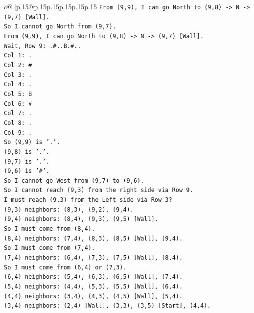 \documentclass{article}
\begin{document}
{\begin{supertabular}{c@{$\;$}|p{.15\linewidth}@{}p{.15\linewidth}p{.15\linewidth}p{.15\linewidth}p{.15\linewidth}p{.15\linewidth}}
{{{\texttt{From (9,9), I can go North to (9,8) {-}> N {-}> (9,7) {[}Wall{]}.} \\
\texttt{So I cannot go North from (9,7).} \\
\texttt{From (9,9), I can go North to (9,8) {-}> N {-}> (9,7) {[}Wall{]}.} \\
\texttt{Wait, Row 9: .\#..B.\#..} \\
\texttt{Col 1: .} \\
\texttt{Col 2: \#} \\
\texttt{Col 3: .} \\
\texttt{Col 4: .} \\
\texttt{Col 5: B} \\
\texttt{Col 6: \#} \\
\texttt{Col 7: .} \\
\texttt{Col 8: .} \\
\texttt{Col 9: .} \\
\texttt{So (9,9) is '.'.} \\
\texttt{(9,8) is '.'.} \\
\texttt{(9,7) is '.'.} \\
\texttt{(9,6) is '\#'.} \\
\texttt{So I cannot go West from (9,7) to (9,6).} \\
\texttt{So I cannot reach (9,3) from the right side via Row 9.} \\
\texttt{I must reach (9,3) from the Left side via Row 3?} \\
\texttt{(9,3) neighbors: (8,3), (9,2), (9,4).} \\
\texttt{(9,4) neighbors: (8,4), (9,3), (9,5) {[}Wall{]}.} \\
\texttt{So I must come from (8,4).} \\
\texttt{(8,4) neighbors: (7,4), (8,3), (8,5) {[}Wall{]}, (9,4).} \\
\texttt{So I must come from (7,4).} \\
\texttt{(7,4) neighbors: (6,4), (7,3), (7,5) {[}Wall{]}, (8,4).} \\
\texttt{So I must come from (6,4) or (7,3).} \\
\texttt{(6,4) neighbors: (5,4), (6,3), (6,5) {[}Wall{]}, (7,4).} \\
\texttt{(5,4) neighbors: (4,4), (5,3), (5,5) {[}Wall{]}, (6,4).} \\
\texttt{(4,4) neighbors: (3,4), (4,3), (4,5) {[}Wall{]}, (5,4).} \\
\texttt{(3,4) neighbors: (2,4) {[}Wall{]}, (3,3), (3,5) {[}Start{]}, (4,4).} \\
}}}
\end{supertabular}}
\end{document}

